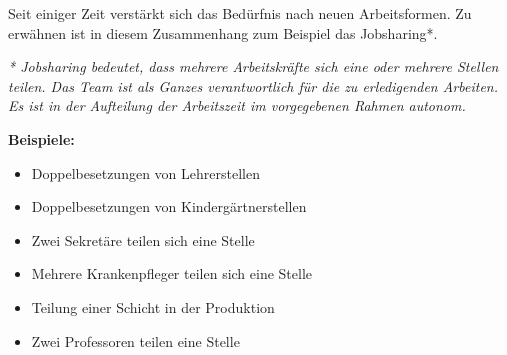 Seit einiger Zeit verstärkt sich das Bedürfnis nach neuen Arbeitsformen.  
Zu erwähnen ist in diesem Zusammenhang zum Beispiel das Jobsharing*.  

\textit{* Jobsharing bedeutet, dass mehrere Arbeitskräfte sich eine oder mehrere Stellen teilen. Das Team ist als Ganzes verantwortlich für die zu erledigenden Arbeiten. Es ist in der Aufteilung der Arbeitszeit im vorgegebenen Rahmen autonom.}  


\textbf{Beispiele:}  
\begin{itemize}
    \item Doppelbesetzungen von Lehrerstellen
    \item Doppelbesetzungen von Kindergärtnerstellen
    \item Zwei Sekretäre teilen sich eine Stelle
    \item Mehrere Krankenpfleger teilen sich eine Stelle
    \item Teilung einer Schicht in der Produktion
    \item Zwei Professoren teilen eine Stelle
\end{itemize}

